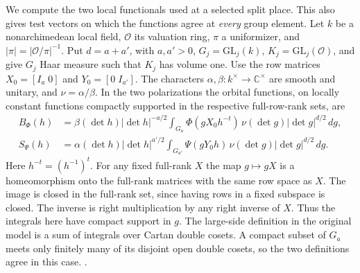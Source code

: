 We compute the two local functionals used at a selected split place. This
also gives test vectors on which the functions agree at \emph{every} group
element. Let \(k\) be a nonarchimedean local field, \(\mathcal O\) its
valuation ring, \(\pi\) a uniformizer, and \(|\pi|=|\mathcal O/\pi|^{-1}\).
Put \(d=a+a'\), with \(a,a'>0\), \(G_j=\mathrm{GL}_j(k)\),
\(K_j=\mathrm{GL}_j(\mathcal O)\), and give \(G_j\) Haar measure
such that \(K_j\) has volume one. Use the row matrices
\(X_0=[I_a\;0]\) and \(Y_0=[0\;I_{a'}]\).
The characters \(\alpha,\beta:k^\times\to\mathbb C^\times\) are smooth
and unitary, and \(\nu=\alpha/\beta\). In the two polarizations the
orbital functions, on locally constant functions compactly supported in
the respective full-row-rank sets, are
\begin{align}
 B_\Phi(h)&=\beta(\det h)|\det h|^{-a/2}
 \int_{G_a}\Phi(gX_0h^{-t})\,\nu(\det g)|\det g|^{d/2}\,dg ,
 \label{newtheta:big}\\
 S_\Psi(h)&=\alpha(\det h)|\det h|^{a'/2}
 \int_{G_{a'}}\Psi(gY_0h)\,\nu(\det g)|\det g|^{d/2}\,dg .
 \label{newtheta:small}
\end{align}
Here \(h^{-t}=(h^{-1})^t\). For any fixed full-rank \(X\) the map
\(g\mapsto gX\) is a homeomorphism onto the full-rank matrices with
the same row space as \(X\). The image is closed in the full-rank set,
since having rows in a fixed subspace is closed. The inverse is right
multiplication by any right inverse of \(X\). Thus the integrals here
have compact support in \(g\). The large-side definition in the original
model is a sum of integrals over Cartan double cosets. A compact subset of
\(G_a\) meets only finitely many of its disjoint open double cosets, so
the two definitions agree in this case.
.

